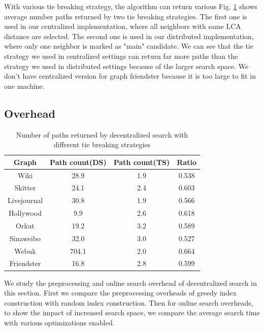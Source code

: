 With various tie breaking strategy, the algorithm can return various  Fig. \ref{table:NOP} shows average number paths returned by two tie breaking strategies. The first one is used in our centralized implementation, where all neighbors with same LCA distance are selected. The second one is used in our distributed implementation, where only one neighbor is marked as "main" candidate. We can see that the tie strategy we used in centralized settings can return far more paths than the strategy we used in distributed settings because of the larger search space. We don't have centralized version for graph friendster because it is too large to fit in one machine.

\subsection{Overhead}
\label{eval_overhead}

\begin{table} [ht]
    \centering
    \begin{tabular}{cccc} \hline
				Graph&Path count(DS)&Path count(TS)&Ratio \\ \hline
				Wiki&28.9&1.9&0.538 \\ \hline
				Skitter&24.1&2.4&0.603 \\ \hline
				Livejournal&30.8&1.9&0.566 \\ \hline
				Hollywood&9.9&2.6&0.618 \\ \hline
				Orkut&19.2&3.2&0.589 \\ \hline
				Sinaweibo&32.0&3.0&0.527 \\ \hline
				Webuk&704.1&2.0&0.664 \\ \hline
				Friendster&16.8&2.8&0.599 \\
    \end{tabular}
    \caption{Number of paths returned by decentralized search with different tie breaking strategies}
    \label{table:NOP}
\end{table}


We study the preprocessing and online search overhead of decentralized search in this section. First we compare the preprocessing overheads of greedy index construction with random index construction. Then for online search overheads, to show the impact of increased search space, we compare the average search time with various optimizations enabled. 

